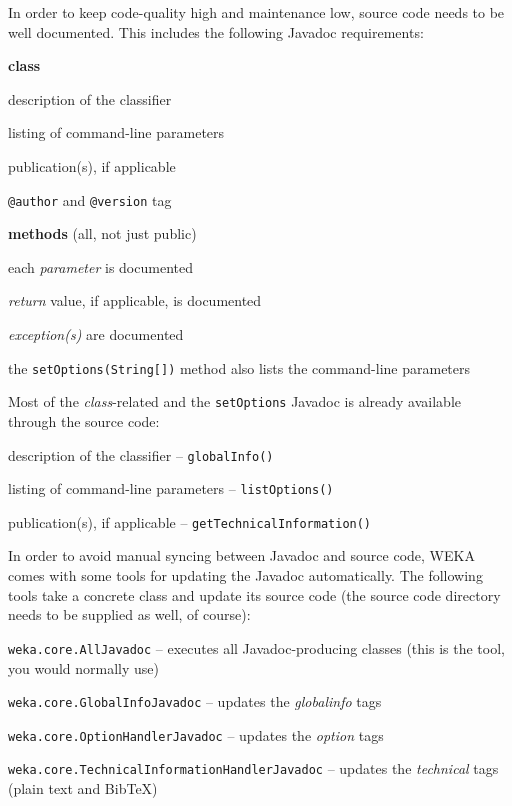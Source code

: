 \newpage
{}
\label{classifier_javadoc}
In order to keep code-quality high and maintenance low, source code needs to
be well documented. This includes the following Javadoc requirements:
\begin{tight_itemize}
  \item \textbf{class}
    \begin{tight_itemize}
      \item description of the classifier
      \item listing of command-line parameters
      \item publication(s), if applicable
      \item \texttt{@author} and \texttt{@version} tag
    \end{tight_itemize}

  \item \textbf{methods} (all, not just public)
    \begin{tight_itemize}
      \item each \textit{parameter} is documented
      \item \textit{return} value, if applicable, is documented
      \item \textit{exception(s)} are documented
      \item the \texttt{setOptions(String[])} method also lists the
command-line parameters
    \end{tight_itemize}
\end{tight_itemize}
Most of the \textit{class}-related and the \texttt{setOptions} Javadoc is
already available through the source code:
\begin{tight_itemize}
  \item description of the classifier -- \texttt{globalInfo()}
  \item listing of command-line parameters -- \texttt{listOptions()}
  \item publication(s), if applicable -- \texttt{getTechnicalInformation()}
\end{tight_itemize}
In order to avoid manual syncing between Javadoc and source code, WEKA comes
with some tools for updating the Javadoc automatically. The following tools take
a concrete class and update its source code (the source code directory needs to
be supplied as well, of course):
\begin{tight_itemize}
  \item \texttt{weka.core.AllJavadoc} -- executes all Javadoc-producing
classes (this is the tool, you would normally use)
  \item \texttt{weka.core.GlobalInfoJavadoc} -- updates the \textit{globalinfo}
tags
  \item \texttt{weka.core.OptionHandlerJavadoc} -- updates the \textit{option}
tags
  \item \texttt{weka.core.TechnicalInformationHandlerJavadoc} -- updates the
\textit{technical} tags (plain text and BibTeX)
\end{tight_itemize}
